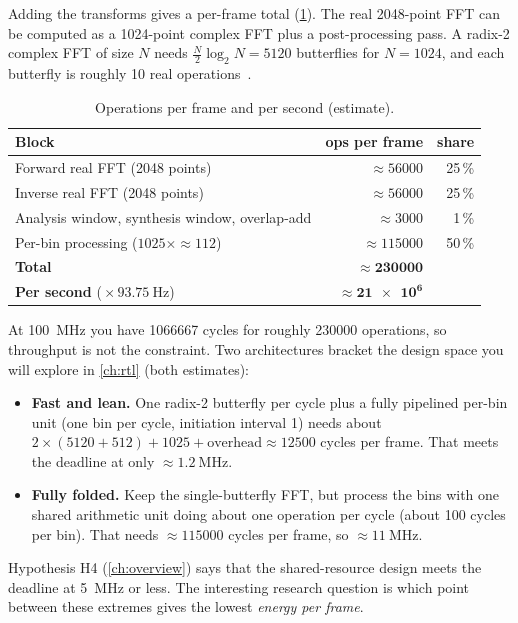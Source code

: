 Adding the transforms gives a per-frame total (\cref{tab:workload:frameops}).
The real 2048-point FFT can be computed as a 1024-point complex FFT plus a
post-processing pass. A radix-2 complex FFT of size $N$ needs
$\frac{N}{2}\log_2 N = \num{5120}$ butterflies for $N=1024$, and each butterfly
is roughly 10 real operations~\cite{cooley1965fft,oppenheim2010dtsp}.

\begin{table}[htbp]
\centering\small
\caption{Operations per frame and per second (estimate).}
\label{tab:workload:frameops}
\begin{tabular}{@{}lrr@{}}
\toprule
Block & ops per frame & share \\
\midrule
Forward real FFT (2048 points) & $\approx\num{56000}$ & 25\,\% \\
Inverse real FFT (2048 points) & $\approx\num{56000}$ & 25\,\% \\
Analysis window, synthesis window, overlap-add & $\approx\num{3000}$ & 1\,\% \\
Per-bin processing ($1025 \times \approx 112$) & $\approx\num{115000}$ & 50\,\% \\
\midrule
\textbf{Total} & $\boldsymbol{\approx\num{230000}}$ & \\
\textbf{Per second} (${}\times\qty{93.75}{\Hz}$) & $\boldsymbol{\approx\num{21e6}}$ & \\
\bottomrule
\end{tabular}
\end{table}

\begin{whybox}
At \qty{100}{\MHz} you have \num{1066667} cycles for roughly \num{230000}
operations, so throughput is not the constraint. Two architectures bracket the
design space you will explore in \cref{ch:rtl} (both estimates):
\begin{itemize}
  \item \textbf{Fast and lean.} One radix-2 butterfly per cycle plus a fully
  pipelined per-bin unit (one bin per cycle, initiation interval 1) needs about
  $2\times(\num{5120}+512)+1025+\text{overhead}\approx\num{12500}$ cycles per
  frame. That meets the deadline at only $\approx\qty{1.2}{\MHz}$.
  \item \textbf{Fully folded.} Keep the single-butterfly FFT, but process the
  bins with one shared arithmetic unit doing about one operation per cycle
  (about 100 cycles per bin). That needs $\approx\num{115000}$ cycles per frame,
  so $\approx\qty{11}{\MHz}$.
\end{itemize}
Hypothesis H4 (\cref{ch:overview}) says that the shared-resource design meets
the deadline at \qty{5}{\MHz} or less. The interesting research question is which
point between these extremes gives the lowest \emph{energy per frame}.
\end{whybox}


